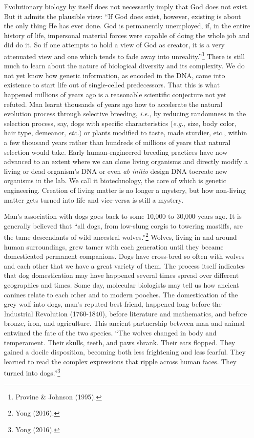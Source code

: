 \begin{multicols}{2}
Evolutionary biology by itself does not necessarily imply that God does not exist. But it admits the plausible view: “If God does exist, however, existing is about the only thing He has ever done. God is permanently unemployed, if, in the entire history of life, impersonal material forces were capable of doing the whole job and did do it. So if one attempts to hold a view of God as creator, it is a very attenuated view and one which tends to fade away into unreality.”\footnote{Provine \& Johnson (1995).}  There is still much to learn about the nature of biological diversity and its complexity. We do not yet know how genetic information, as encoded in the DNA, came into existence to start life out of single-celled predecessors. That this is what happened millions of years ago is a reasonable scientific conjecture not yet refuted. Man learnt thousands of years ago how to accelerate the natural evolution process through selective breeding, \textit{i.e.,} by reducing randomness in the selection process, say, dogs with specific characteristics (\textit{e.g.,} size, body color, hair type, demeanor, \textit{etc.}) or plants modified to taste, made sturdier, etc., within a few thousand years rather than hundreds of millions of years that natural selection would take. Early human-engineered breeding practices have now advanced to an extent where we can clone living organisms and directly modify a living or dead organism's DNA or even \textit{ab initio} design DNA to\break create new organisms in the lab. We call it biotechnology, the core of which is genetic engineering. Creation of living matter is no longer a mystery, but how non-living matter gets turned into life and vice-versa is still a mystery.

Man's association with dogs goes back to some 10,000 to 30,000 years ago. It is generally believed that “all dogs, from low-slung corgis to towering mastiffs, are the tame descendants of wild ancestral wolves.”\footnote{Yong (2016).} Wolves, living in and around human surroundings, grew tamer with each generation until they became domesticated permanent companions. Dogs have cross-bred so often with wolves and each other that we have a great variety of them. The process itself indicates that dog domestication may have happened several times spread over different geographies and times. Some day, molecular biologists may tell us how ancient canines relate to each other and to modern pooches. The domestication of the grey wolf into dogs, man's reputed best friend, happened long before the Industrial Revolution (1760-1840), before literature and mathematics, and before bronze, iron, and agriculture. This ancient partnership between man and animal entwined the fate of the two species. “The wolves changed in body and temperament. Their skulls, teeth, and paws shrank. Their ears flopped. They gained a docile disposition, becoming both less frightening and less fearful. They learned to read the complex expressions that ripple across human faces. They turned into dogs.”\footnote{Yong (2016).}


\end{multicols}
